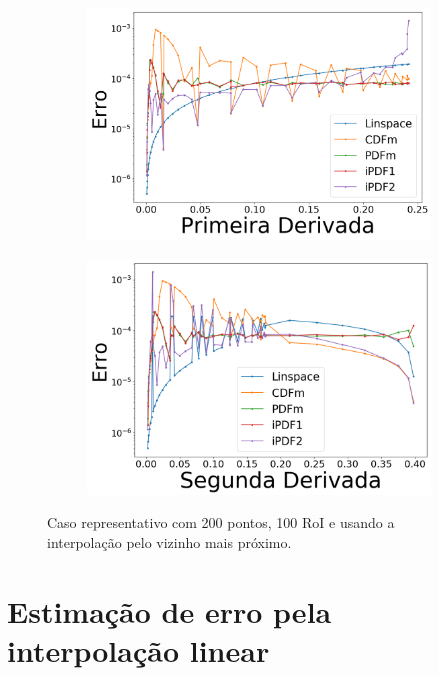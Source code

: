 \begin{figure}[H]
	\begin{subfigure}[b]{0.45\textwidth}
		\centering 
		\includegraphics[width=\textwidth]{./figuras/error_normal_nearest_Primeira Derivada.png}
		\caption{}
		\label{fig:12c}
	\end{subfigure}
	\hfill
	\begin{subfigure}[b]{0.45\textwidth}
		\centering 
		\includegraphics[width=\textwidth]{./figuras/error_normal_nearest_Segunda Derivada.png}
		\caption{}
		\label{fig:12d}
	\end{subfigure}
	\caption{Caso representativo com 200 pontos, 100 \ac{RoI} e usando a interpolação pelo vizinho mais próximo.}
	\label{fig:12}
\end{figure}

\section{Estimação de erro pela interpolação linear} \label{cap:interp_lin}

